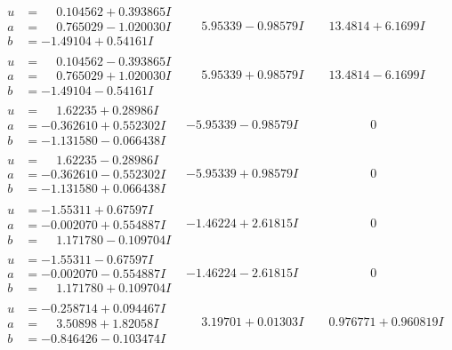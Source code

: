 \documentclass[1p]{elsarticle_modified}
\theoremstyle{definition}
\begin{document}
$$\begin{array}{c|c|c}
\begin{aligned}
u &= \phantom{-}0.104562 + 0.393865 I \\
a &= \phantom{-}0.765029 - 1.020030 I \\
b &= -1.49104 + 0.54161 I\end{aligned}
 & \phantom{-}5.95339 - 0.98579 I & \phantom{-}13.4814 + 6.1699 I \\ \hline\begin{aligned}
u &= \phantom{-}0.104562 - 0.393865 I \\
a &= \phantom{-}0.765029 + 1.020030 I \\
b &= -1.49104 - 0.54161 I\end{aligned}
 & \phantom{-}5.95339 + 0.98579 I & \phantom{-}13.4814 - 6.1699 I \\ \hline\begin{aligned}
u &= \phantom{-}1.62235 + 0.28986 I \\
a &= -0.362610 + 0.552302 I \\
b &= -1.131580 - 0.066438 I\end{aligned}
 & -5.95339 - 0.98579 I & \phantom{-0.000000 } 0 \\ \hline\begin{aligned}
u &= \phantom{-}1.62235 - 0.28986 I \\
a &= -0.362610 - 0.552302 I \\
b &= -1.131580 + 0.066438 I\end{aligned}
 & -5.95339 + 0.98579 I & \phantom{-0.000000 } 0 \\ \hline\begin{aligned}
u &= -1.55311 + 0.67597 I \\
a &= -0.002070 + 0.554887 I \\
b &= \phantom{-}1.171780 - 0.109704 I\end{aligned}
 & -1.46224 + 2.61815 I & \phantom{-0.000000 } 0 \\ \hline\begin{aligned}
u &= -1.55311 - 0.67597 I \\
a &= -0.002070 - 0.554887 I \\
b &= \phantom{-}1.171780 + 0.109704 I\end{aligned}
 & -1.46224 - 2.61815 I & \phantom{-0.000000 } 0 \\ \hline\begin{aligned}
u &= -0.258714 + 0.094467 I \\
a &= \phantom{-}3.50898 + 1.82058 I \\
b &= -0.846426 - 0.103474 I\end{aligned}
 & \phantom{-}3.19701 + 0.01303 I & \phantom{-}0.976771 + 0.960819 I \\ \hline\begin{aligned}

\end{aligned}
\end{array}$$
\end{document}
